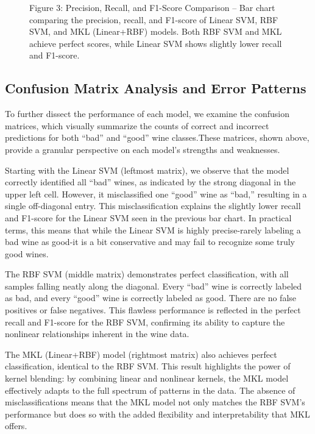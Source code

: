 \documentclass[11pt]{article}
\begin{document}
\begin{figure}[h]
\begin{center}
\end{center}
\caption{Figure 3: Precision, Recall, and F1-Score Comparison – Bar chart comparing the precision, recall, and F1-score of Linear SVM, RBF SVM, and MKL (Linear+RBF) models. Both RBF SVM and MKL achieve perfect scores, while Linear SVM shows slightly lower recall and F1-score.}
\label{experiment1fitness}
\end{figure}


\subsection{Confusion Matrix Analysis and Error Patterns}
To further dissect the performance of each model, we examine the confusion matrices, which visually summarize the counts of correct and incorrect predictions for both “bad” and “good” wine classes.These matrices, shown above, provide a granular perspective on each model’s strengths and weaknesses.

Starting with the Linear SVM (leftmost matrix), we observe that the model correctly identified all “bad” wines, as indicated by the strong diagonal in the upper left cell. However, it misclassified one “good” wine as “bad,” resulting in a single off-diagonal entry. This misclassification explains the slightly lower recall and F1-score for the Linear SVM seen in the previous bar chart. In practical terms, this means that while the Linear SVM is highly precise-rarely labeling a bad wine as good-it is a bit conservative and may fail to recognize some truly good wines.

The RBF SVM (middle matrix) demonstrates perfect classification, with all samples falling neatly along the diagonal. Every “bad” wine is correctly labeled as bad, and every “good” wine is correctly labeled as good. There are no false positives or false negatives. This flawless performance is reflected in the perfect recall and F1-score for the RBF SVM, confirming its ability to capture the nonlinear relationships inherent in the wine data.

The MKL (Linear+RBF) model (rightmost matrix) also achieves perfect classification, identical to the RBF SVM. This result highlights the power of kernel blending: by combining linear and nonlinear kernels, the MKL model effectively adapts to the full spectrum of patterns in the data. The absence of misclassifications means that the MKL model not only matches the RBF SVM’s performance but does so with the added flexibility and interpretability that MKL offers.
\end{document}
